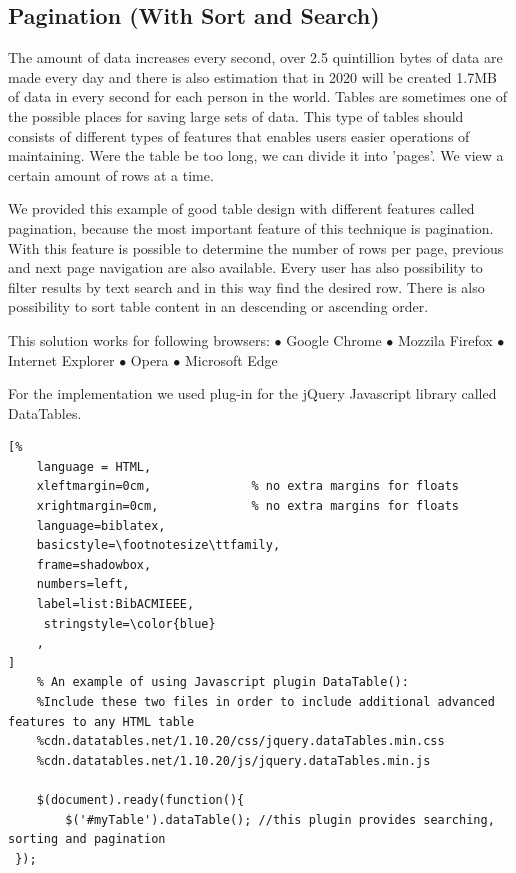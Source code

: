 \subsection{Pagination (With Sort and Search)}
The amount of data increases every second, over 2.5 quintillion bytes of data are made every day and there is also estimation that in 2020 will be created 1.7MB of data in every second for each person in the world. 
\newline 
Tables are sometimes one of the possible places for saving large sets of data.
This type of tables should consists of different types of features that enables users easier operations of maintaining.
\newline
Were the table be too long, we can divide it into 'pages'. We view a certain amount of rows at a time.
\newline

We provided this example of good table design with different features called pagination, because the most important feature of this technique is pagination.
With this feature is possible to determine the number of rows per page, previous  and next page navigation are also available. 
Every user has also possibility to filter results by text search and in this way find the desired row.
There is also possibility to sort table content in an descending or ascending order.

This solution works for following browsers:
\newline $\bullet$ Google Chrome
\newline $\bullet$ Mozzila Firefox
\newline $\bullet$ Internet Explorer
\newline $\bullet$ Opera
\newline $\bullet$ Microsoft Edge

For the implementation we used plug-in for the jQuery Javascript library called DataTables.


\begin{lstlisting}[%
    language = HTML, 
    xleftmargin=0cm,              % no extra margins for floats
    xrightmargin=0cm,             % no extra margins for floats
    language=biblatex,
    basicstyle=\footnotesize\ttfamily,
    frame=shadowbox,
    numbers=left,
    label=list:BibACMIEEE,
     stringstyle=\color{blue}
    ,
]
    % An example of using Javascript plugin DataTable():
    %Include these two files in order to include additional advanced features to any HTML table
    %cdn.datatables.net/1.10.20/css/jquery.dataTables.min.css
    %cdn.datatables.net/1.10.20/js/jquery.dataTables.min.js

    $(document).ready(function(){
        $('#myTable').dataTable(); //this plugin provides searching, sorting and pagination
 });

\end{lstlisting}

